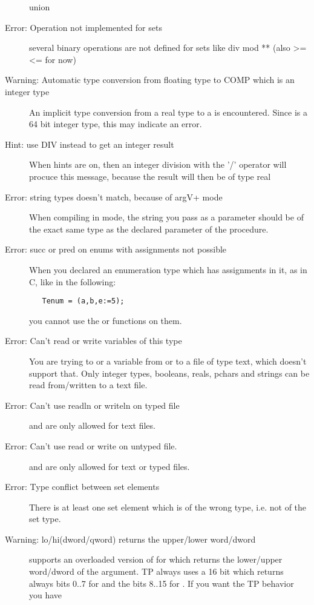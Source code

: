 \begin{description}
 union
\item [Error: Operation not implemented for sets]
 several binary operations are not defined for sets
 like div mod ** (also >= <= for now)
\item [Warning: Automatic type conversion from floating type to COMP which is an integer type]
 An implicit type conversion from a real type to a  is
 encountered. Since  is a 64 bit integer type, this may indicate
 an error.
\item [Hint: use DIV instead to get an integer result]
 When hints are on, then an integer division with the '/' operator will
 procuce this message, because the result will then be of type real
\item [Error: string types doesn't match, because of argV+ mode]
 When compiling in  mode, the string you pass as a parameter
 should be of the exact same type as the declared parameter of the procedure.
\item [Error: succ or pred on enums with assignments not possible]
 When you declared an enumeration type which has assignments in it, as in C,
 like in the following:
 \begin{verbatim}
   Tenum = (a,b,e:=5);
 \end{verbatim}
 you cannot use the  or  functions on them.
\item [Error: Can't read or write variables of this type]
 You are trying to  or  a variable from or to a
 file of type text, which doesn't support that. Only integer types,
 booleans, reals, pchars and strings can be read from/written to a text file.
\item [Error: Can't use readln or writeln on typed file]
  and  are only allowed for text files.
\item [Error: Can't use read or write on untyped file.]
  and  are only allowed for text or typed files.
\item [Error: Type conflict between set elements]
 There is at least one set element which is of the wrong type, i.e. not of
 the set type.
\item [Warning: lo/hi(dword/qword) returns the upper/lower word/dword]
 \fpc supports an overloaded version of  for 
 which returns the lower/upper word/dword of the argument. TP always uses
 a 16 bit  which returns always bits 0..7 for  and the
 bits 8..15 for . If you want the TP behavior you have

\end{description}
